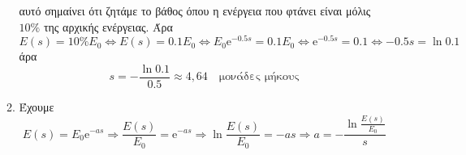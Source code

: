 \begin{enumerate}
\begin{solution}
\begin{enumerate}
          αυτό σημαίνει ότι ζητάμε το βάθος όπου η ενέργεια που φτάνει είναι μόλις 
          $ 10\% $ της αρχικής ενέργειας. Άρα
          \[ 
            E(s) = 10\% E_{0} \Leftrightarrow E(s) = 0.1E_{0} \Leftrightarrow E_{0}
            \mathrm{e}^{-0.5s} = 0.1E_{0} \Leftrightarrow \mathrm{e}^{-0.5s} = 0.1
            \Leftrightarrow -0.5s = \ln{0.1} 
          \]
          άρα
          \[
            s = - \frac{\ln{0.1}}{0.5} \approx 4,64 \quad\text{μονάδες μήκους}
          \] 
        \item Έχουμε 
          \[
            E(s) = E_{0} \mathrm{e}^{-as} \Rightarrow \frac{E(s)}{E_{0}} =
            \mathrm{e}^{-as} \Rightarrow \ln{\frac{E(s)}{E_{0}}} = -as \Rightarrow 
            a = - \frac{\ln{\frac{E(s)}{E_{0}}}}{s}
          \] 
      \end{enumerate}
    \end{solution}
\end{enumerate}


